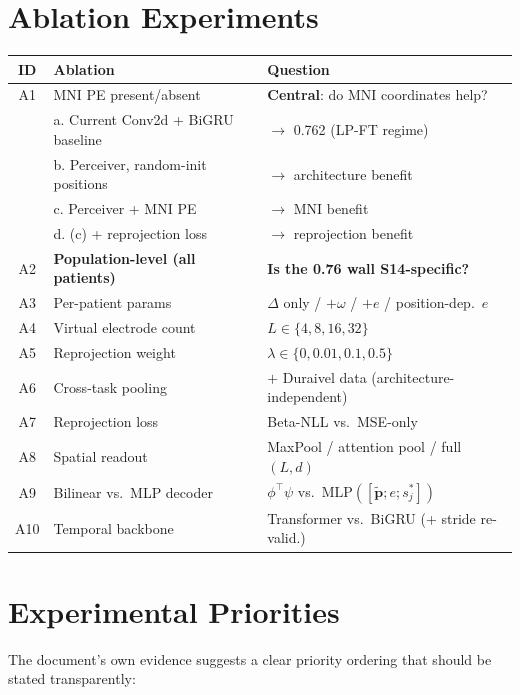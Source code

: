 \documentclass[11pt,letterpaper]{article}
\newcommand{\bfp}{\mathbf{p}}
\begin{document}
\section{Ablation Experiments}

\begin{table}[ht!]\centering\small
\begin{tabular}{@{}clp{7.0cm}@{}}
\toprule
\textbf{ID} & \textbf{Ablation} & \textbf{Question} \\
\midrule
A1 & MNI PE present/absent & \textbf{Central}: do MNI coordinates help? \\
 & \quad a. Current Conv2d + BiGRU baseline & $\to$ 0.762 (LP-FT regime) \\
 & \quad b. Perceiver, random-init positions & $\to$ architecture benefit \\
 & \quad c. Perceiver + MNI PE & $\to$ MNI benefit \\
 & \quad d. (c) + reprojection loss & $\to$ reprojection benefit \\
\midrule
A2 & \textbf{Population-level (all patients)} & \textbf{Is the 0.76 wall S14-specific?} \\
\midrule
A3 & Per-patient params & $\Delta$ only / $+\omega$ / $+e$ / position-dep.\ $e$ \\
A4 & Virtual electrode count & $L \in \{4, 8, 16, 32\}$ \\
A5 & Reprojection weight & $\lambda \in \{0, 0.01, 0.1, 0.5\}$ \\
A6 & Cross-task pooling & $+$ Duraivel data (architecture-independent) \\
A7 & Reprojection loss & Beta-NLL vs.\ MSE-only \\
A8 & Spatial readout & MaxPool / attention pool / full $(L,d)$ \\
A9 & Bilinear vs.\ MLP decoder & $\phi^\top\psi$ vs.\ $\text{MLP}([\tilde{\bfp}; e; s_j^*])$ \\
A10 & Temporal backbone & Transformer vs.\ BiGRU (+ stride re-valid.) \\
\bottomrule
\end{tabular}
\end{table}


\section{Experimental Priorities}\label{sec:priorities}

The document's own evidence suggests a clear priority ordering that should be stated transparently:
\end{document}
